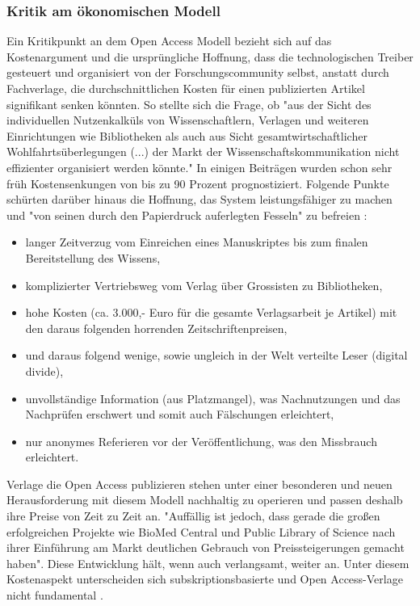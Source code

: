 \subsubsection{Kritik am ökonomischen Modell}

Ein Kritikpunkt an dem Open Access Modell bezieht sich auf das Kostenargument und die ursprüngliche Hoffnung, dass die technologischen Treiber gesteuert und organisiert von der Forschungscommunity selbst, anstatt durch Fachverlage, die durchschnittlichen Kosten für einen publizierten Artikel signifikant senken könnten. So stellte sich die Frage, ob "aus der Sicht des individuellen Nutzenkalküls von Wissenschaftlern, Verlagen und weiteren Einrichtungen wie Bibliotheken als auch aus Sicht gesamtwirtschaftlicher Wohlfahrtsüberlegungen (...) der Markt der Wissenschaftskommunikation nicht effizienter organisiert werden könnte."\cite{Hess_2006} In einigen Beiträgen wurden schon sehr früh Kostensenkungen von bis zu 90 Prozent \cite{hilf_2004} \cite{suchen} prognostiziert. Folgende Punkte schürten darüber hinaus die Hoffnung, das System leistungsfähiger zu machen und "von seinen durch den Papierdruck auferlegten Fesseln" zu befreien \cite{hilf_2004}:
\begin{itemize}
\item langer Zeitverzug vom Einreichen eines Manuskriptes bis zum finalen Bereitstellung des Wissens,
\item komplizierter Vertriebsweg vom Verlag über Grossisten zu Bibliotheken,
\item hohe Kosten (ca. 3.000,- Euro für die gesamte Verlagsarbeit je Artikel) mit den daraus folgenden horrenden Zeitschriftenpreisen,
\item und daraus folgend wenige, sowie ungleich in der Welt verteilte Leser (digital divide),
\item unvollständige Information (aus Platzmangel), was Nachnutzungen und das Nachprüfen erschwert und somit auch Fälschungen erleichtert,
\item nur anonymes Referieren vor der Veröffentlichung, was den Missbrauch erleichtert.
\end{itemize}

Verlage die Open Access publizieren stehen unter einer besonderen und neuen Herausforderung mit diesem Modell nachhaltig zu operieren und passen deshalb ihre Preise von Zeit zu Zeit an. "Auffällig ist jedoch, dass gerade die großen erfolgreichen Projekte wie BioMed Central und Public Library of Science nach ihrer Einführung am Markt deutlichen Gebrauch von Preissteigerungen gemacht haben"\cite{schmidt_2007_goldenen}. Diese Entwicklung hält, wenn auch verlangsamt, weiter an\cite{suchen}. Unter diesem Kostenaspekt unterscheiden sich subskriptionsbasierte und Open Access-Verlage nicht fundamental \cite{schmidt_2007_goldenen}.

